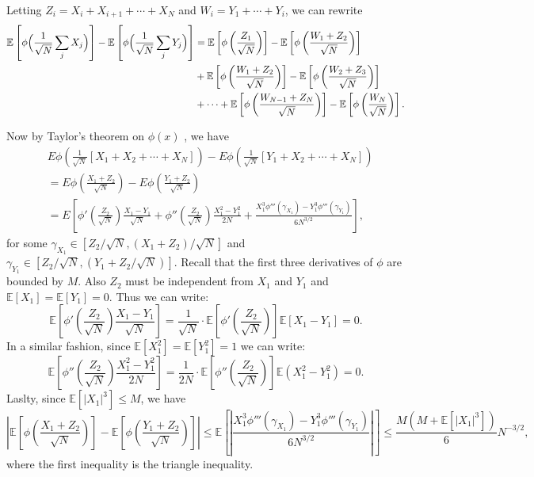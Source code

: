 \documentclass[11pt,letterpaper]{article}
\def\E{\mathbb{E}}
\begin{document}
\begin{solution}
    Letting $Z_i = X_i + X_{i+1} + \cdots + X_N$ and $W_i = Y_1 + \cdots + Y_i$, we can rewrite
    \begin{align*}
        \E\left[\phi\Bigl(\frac1{\sqrt{N}}\sum_j X_j\Bigr)\right] - \E\left[\phi\Bigl(\frac1{\sqrt{N}}\sum_j Y_j\Bigr)\right]
        &= \E\left[\phi\left(\frac{Z_1}{\sqrt{N}}\right)\right] - \E\left[\phi\left(\frac{W_1+Z_2}{\sqrt{N}}\right)\right] \\
        &+ \E\left[\phi\left(\frac{W_1+Z_2}{\sqrt{N}}\right)\right] -\E\left[\phi\left(\frac{W_2+Z_3}{\sqrt{N}}\right)\right] \\
        &+\cdots+\E\left[\phi\left(\frac{W_{N-1}+Z_N}{\sqrt{N}}\right)\right] - \E\left[\phi\left(\frac{W_N}{\sqrt{N}}\right)\right].
    \end{align*}

    Now by Taylor's theorem on $\phi(x)$ , we have
\begin{align*}
&E\phi\left(\frac1{\sqrt{N}}[X_1+X_2+\cdots+X_N]\right) - E\phi\left(\frac1{\sqrt{N}}[Y_1+X_2+\cdots+X_N]\right) \\
&= E\phi\left(\frac{X_1+Z_2}{\sqrt{N}}\right)-E\phi\left(\frac{Y_1+Z_2}{\sqrt{N}}\right) \\
&= E\left[\phi'\left(\frac{Z_2}{\sqrt{N}}\right)\frac{X_1-Y_1}{\sqrt{N}} + \phi''\left(\frac{Z_2}{\sqrt{N}}\right)\frac{X_1^2-Y_1^2}{2N} + \frac{X_1^3\phi'''(\gamma_{X_1})-Y_1^3\phi'''(\gamma_{Y_1})}{6N^{3/2}}\right],
\end{align*}
for some $\gamma_{X_1} \in [Z_2 /\sqrt{N}, (X_1+Z_2) /\sqrt{N}]$ and $\gamma_{Y_1}\in [Z_2 / \sqrt{N}, (Y_1+Z_2 / \sqrt{N})]$. Recall that the first three derivatives of $\phi$ are bounded by $M$. Also $Z_2$ must be independent from $X_1$ and $Y_1$ and $\E[X_1]=\E[Y_1]=0$. Thus we can write: 
\[
\E\left[\phi'\left(\frac{Z_2}{\sqrt{N}}\right)\frac{X_1-Y_1}{\sqrt{N}}\right] = \frac{1}{\sqrt{N}}\cdot\E\left[\phi'\left(\frac{Z_2}{\sqrt{N}}\right)\right]\E\left[X_1-Y_1\right] = 0.
\] 
In a similar fashion, since $\E[X_1^2]=\E[Y_1^2]=1$ we can write:
\[
\E\left[\phi''\left(\frac{Z_2}{\sqrt{N}}\right)\frac{X_1^2-Y_1^2}{2N}\right] = \frac{1}{2N}\cdot\E\left[\phi''\left(\frac{Z_2}{\sqrt{N}}\right)\right] \E(X_1^2-Y_1^2) = 0.
\]
Laslty, since $\E[|X_1|^3]\leq M$, we have
\[
\left|\E\left[\phi\left(\frac{X_1+Z_2}{\sqrt{N}}\right)\right]-\E\left[\phi\left(\frac{Y_1+Z_2}{\sqrt{N}}\right)\right]\right| \leq \E\left[\left|\frac{X_1^3\phi'''(\gamma_{X_1})-Y_1^3\phi'''(\gamma_{Y_1})}{6N^{3/2}}\right|\right] \leq \frac{M(M+\E[|X_1|^3])}{6}N^{-3/2},
\]
where the first inequality is the triangle inequality.


\end{solution}
\end{document}
